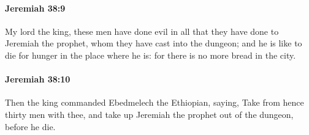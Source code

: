 		\paragraph{Jeremiah 38:9} %
			\label{JEREMIAH-38-9}

			My lord the king, these men have done evil in all that they have done to Jeremiah the prophet, whom they have cast into the dungeon; and he is like to die for hunger in the place where he is: for there is no more bread in the city.


		\paragraph{Jeremiah 38:10} %
			\label{JEREMIAH-38-10}

			Then the king commanded Ebedmelech the Ethiopian, saying, Take from hence thirty men with thee, and take up Jeremiah the prophet out of the dungeon, before he die.

